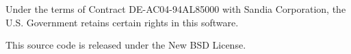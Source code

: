 
Under the terms of Contract DE-AC04-94AL85000 with Sandia Corporation, the
U.S. Government retains certain rights in this software.

This source code is released under the New BSD License.
